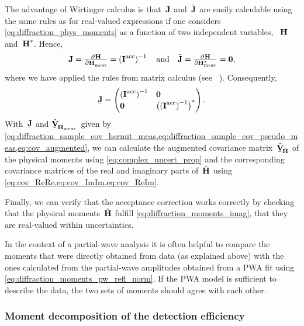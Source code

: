 The advantage of Wirtinger calculus is that~$\bm{\mathrm{J}}$
and~$\tilde{\bm{\mathrm{J}}}$ are easily calculable using the same rules as
for real-valued expressions if one considers
\cref{eq:diffraction_phys_moments} as a function of two independent
variables, ~$\bm{\mathrm{H}}$ and~$\bm{\mathrm{H}}^*$.  Hence,
\begin{equation}
  \mat{J}
  = \pd{\vect{H}}{\vect{H}_\text{meas}}
  = \rBrk[0]{\mat{I}^\text{acc}}^{-1}
  \quad\text{and}\quad
  \tilde{\mat{J}}
  = \pd{\vect{H}}{{\vect{H}_\text{meas}^*}}
  = \mat{0},
\end{equation}
where we have applied the rules from matrix calculus (see \eg\
).  Consequently,
\begin{equation}
  \underaccent{\bar}{\mat{J}}
  = \begin{pmatrix*}[l]
    \rBrk[0]{\mat{I}^\text{acc}}^{-1} & \mat{0} \\
    \mat{0}                           & \rBrk[1]{\rBrk[0]{\mat{I}^\text{acc}}^{-1}}^*
  \end{pmatrix*}.
\end{equation}
With~$\underaccent{\bar}{\mat{J}}$ and
$\hat{\underaccent{\bar}{\covMatSym}}_{\!\hat{\vect{H}}_\text{meas}}$~given
by
\cref{eq:diffraction_sample_cov_hermit_meas,eq:diffraction_sample_cov_pseudo_meas,eq:cov_augmented},
we can calculate the augmented covariance
matrix~$\hat{\underaccent{\bar}{\covMatSym}}_{\!\hat{\vect{H}}}$ of
the physical moments using \cref{eq:complex_uncert_prop} and the
corresponding covariance matrices of the real and imaginary parts
of~$\hat{\bm{\mathrm{H}}}$ using \cref{eq:cov_ReRe,eq:cov_ImIm,eq:cov_ReIm}.

Finally, we can verify that the acceptance correction works correctly
by checking that the physical moments~$\hat{\bm{\mathrm{H}}}$ fulfill
\cref{eq:diffraction_moments_imag}, \ie that they are real-valued
within uncertainties.

In the context of a partial-wave analysis it is often helpful to
compare the moments that were directly obtained from data (as
explained above) with the ones calculated from the partial-wave
amplitudes obtained from a PWA fit using
\cref{eq:diffraction_moments_pw_refl_norm}.  If the PWA model is sufficient
to describe the data, the two sets of moments should agree with each
other.


\subsubsection{Moment decomposition of the detection efficiency}%
\label{sec:diffraction:acceptance_moment_decomp}

